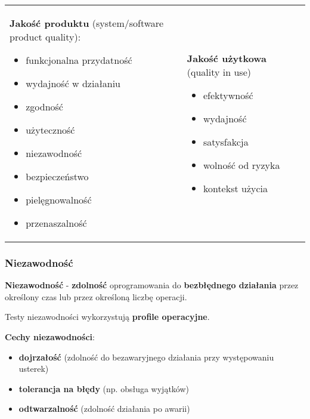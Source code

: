 \documentclass[../main.tex]{subfiles}
\begin{document}
    \begin{table}[H]
        \begin{center}
            \begin{tabular}{p{8cm} p{8cm}}
                \textbf{ Jakość produktu} (system/software product quality):
                \begin{itemize}
                    \item funkcjonalna przydatność
                    \item wydajność w działaniu
                    \item zgodność
                    \item użyteczność
                    \item niezawodność
                    \item bezpieczeństwo
                    \item pielęgnowalność
                    \item przenaszalność
                \end{itemize}
                &
                \textbf{Jakość użytkowa} (quality in use)
                \begin{itemize}
                    \item efektywność
                    \item wydajność
                    \item satysfakcja
                    \item wolność od ryzyka
                    \item kontekst użycia
                \end{itemize}
            \end{tabular}
        \end{center}
    \end{table}

    \subsubsection{Niezawodność}

    \textbf{Niezawodność} - \textbf{zdolność} oprogramowania do \textbf{bezbłędnego działania} przez określony czas lub przez określoną
    liczbę operacji.

    Testy niezawodności wykorzystują \textbf{profile operacyjne}.

    \textbf{Cechy niezawodności}:
    \begin{itemize}
        \item \textbf{dojrzałość} (zdolność do bezawaryjnego działania przy występowaniu usterek)
        \item \textbf{tolerancja na błędy} (np. obsługa wyjątków)
        \item \textbf{odtwarzalność} (zdolność działania po awarii)
    \end{itemize}
\end{document}
